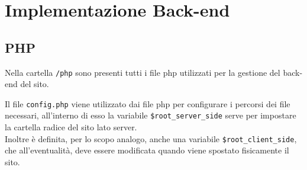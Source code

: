 \section{Implementazione Back-end}
\label{sec:back-end}

\subsection{PHP}
\label{subsec:php}
Nella cartella \texttt{/php} sono presenti tutti i file php utilizzati per la gestione del back-end del sito.

Il file \texttt{config.php} viene utilizzato dai file php per configurare i percorsi dei file necessari, all'interno di esso la variabile \texttt{\$root\_server\_side}
serve per impostare la cartella radice del sito lato server. \\
Inoltre è definita, per lo scopo analogo, anche una variabile \texttt{\$root\_client\_side}, che all'eventualità, deve essere modificata quando viene spostato fisicamente il sito.

